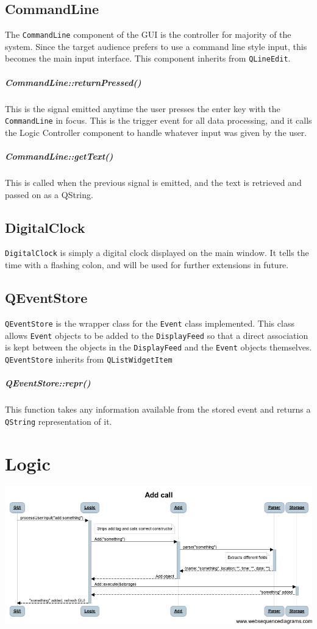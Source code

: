 \documentclass[12pt]{extarticle}
\begin{document}
\subsection{CommandLine}
The \texttt{CommandLine} component of the GUI is the controller for majority of the system. Since the target audience prefers to use a command line style input, this becomes the main input interface. This component inherits from \texttt{QLineEdit}.
\subparagraph{CommandLine::returnPressed()} This is the signal emitted anytime the user presses the enter key with the \texttt{CommandLine} in focus. This is the trigger event for all data processing, and it calls the Logic Controller component to handle whatever input was given by the user.
\subparagraph{CommandLine::getText()} This is called when the previous signal is emitted, and the text is retrieved and passed on as a QString.
\subsection{DigitalClock}
\texttt{DigitalClock} is simply a digital clock displayed on the main window. It tells the time with a flashing colon, and will be used for further extensions in future.
\subsection{QEventStore}
\texttt{QEventStore} is the wrapper class for the \texttt{Event} class implemented. This class allows \texttt{Event} objects to be added to the \texttt{DisplayFeed} so that a direct association is kept between the objects in the \texttt{DisplayFeed} and the \texttt{Event} objects themselves. \texttt{QEventStore} inherits from \texttt{QListWidgetItem}

\subparagraph{QEventStore::repr()} This function takes any information available from the stored event and returns a \texttt{QString} representation of it.

\newpage

\section{Logic}

\includegraphics[width=\textwidth]{add_call_diagram}
\end{document}
